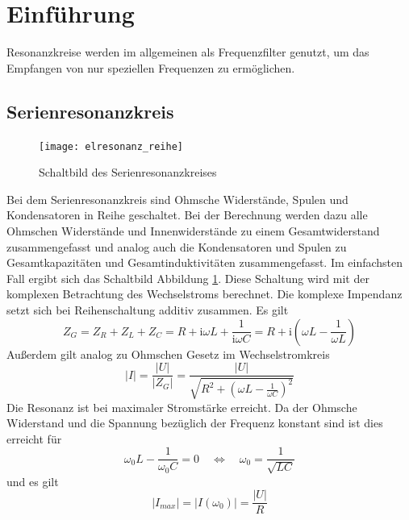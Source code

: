 \section{Einführung}
Resonanzkreise werden im allgemeinen als Frequenzfilter genutzt, um das Empfangen von nur speziellen Frequenzen zu ermöglichen.
\subsection{Serienresonanzkreis}
\begin{figure}[H]
	\centering
	\texttt{[image: elresonanz\_reihe]}
	\caption{Schaltbild des Serienresonanzkreises}
	\label{fig:aufbaureihe}
\end{figure}
Bei dem Serienresonanzkreis sind Ohmsche Widerstände, Spulen und Kondensatoren in Reihe geschaltet. Bei der Berechnung werden dazu alle Ohmschen Widerstände und Innenwiderstände zu einem Gesamtwiderstand zusammengefasst und analog auch die Kondensatoren und Spulen zu Gesamtkapazitäten und Gesamtinduktivitäten zusammengefasst. Im einfachsten Fall ergibt sich das Schaltbild Abbildung \ref{fig:aufbaureihe}. Diese Schaltung wird mit der komplexen Betrachtung des Wechselstroms berechnet. Die komplexe Impendanz setzt sich bei Reihenschaltung additiv zusammen. Es gilt \begin{equation}
	Z_G = Z_R + Z_L + Z_C = R + \mathrm i\omega L + \frac{1}{\mathrm{i}\omega C} = R + \mathrm i \left(\omega L - \frac{1}{\omega L}\right)
\end{equation}
Außerdem gilt analog zu Ohmschen Gesetz im Wechselstromkreis
\begin{equation}
	|I| = \frac{|U|}{|Z_G|} = \frac{|U|}{\sqrt{R^2 + \left(\omega L - \frac{1}{\omega C}\right)^2}} \label{eq:serienstrom}
\end{equation}
Die Resonanz ist bei maximaler Stromstärke erreicht. Da der Ohmsche Widerstand und die Spannung bezüglich der Frequenz konstant sind ist dies erreicht für
\begin{equation}
	\omega_0 L - \frac{1}{\omega_0 C} = 0 \quad \Leftrightarrow \quad \omega_0 = \frac{1}{\sqrt{LC}} \label{eq:resbed}
\end{equation}
und es gilt 
\begin{equation}
	|I_{max}| = |I(\omega_0)| = \frac{|U|}{R}
\end{equation}
